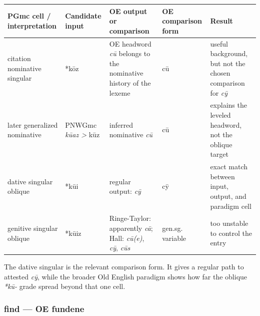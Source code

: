 \documentclass[
  british,
  a4paper,
]{article}
\newcounter{none} %
\begin{document}
{\def\LTcaptype{none} %
\begin{longtable}[]{@{}
  >{\raggedright\arraybackslash}p{}
  >{\raggedright\arraybackslash}p{}
  >{\raggedright\arraybackslash}p{}
  >{\raggedright\arraybackslash}p{}
  >{\raggedright\arraybackslash}p{}@{}}
\toprule\noalign{}
\begin{minipage}[b]{\linewidth}\raggedright
PGmc cell / interpretation
\end{minipage} & \begin{minipage}[b]{\linewidth}\raggedright
Candidate input
\end{minipage} & \begin{minipage}[b]{\linewidth}\raggedright
OE output or comparison
\end{minipage} & \begin{minipage}[b]{\linewidth}\raggedright
OE comparison form
\end{minipage} & \begin{minipage}[b]{\linewidth}\raggedright
Result
\end{minipage} \\
\midrule\noalign{}
\endhead
\bottomrule\noalign{}
\endlastfoot
citation nominative singular & *kōz & OE headword \emph{cū} belongs to
the nominative history of the lexeme & cū & useful background, but not
the chosen comparison for \emph{cȳ} \\
later generalized nominative & PNWGmc \emph{kūaz \textgreater{} }kūz &
inferred nominative \emph{cū} & cū & explains the leveled headword, not
the oblique target \\
dative singular oblique & *kūi & regular output: \emph{cȳ} & cȳ & exact
match between input, output, and paradigm cell \\
genitive singular oblique & *kūiz & Ringe-Taylor: apparently \emph{cā};
Hall: \emph{cū(e)}, \emph{cȳ}, \emph{cūs} & gen.sg. variable & too
unstable to control the entry \\
\end{longtable}
}

The dative singular is the relevant comparison form. It gives a regular
path to attested \emph{cȳ}, while the broader Old English paradigm shows
how far the oblique \emph{*kū-} grade spread beyond that one cell.

\subsubsection{find --- OE fundene}\label{find-oe-fundene}
\end{document}
